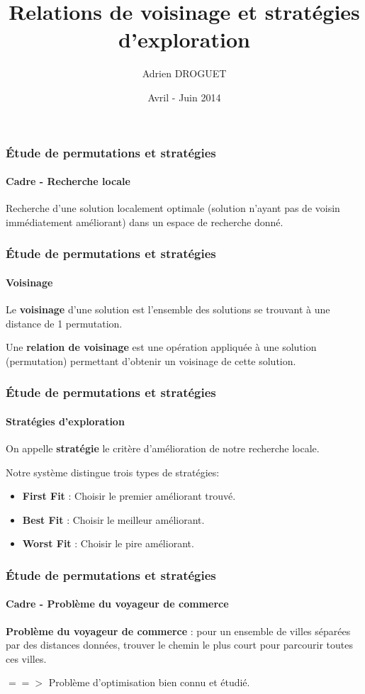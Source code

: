 \documentclass{beamer}
\title{Relations de voisinage et stratégies d'exploration}
\author{Adrien DROGUET}
\date{Avril - Juin 2014}
\begin{document}
\frame{\titlepage}


\begin{frame}
  \frametitle{Étude de permutations et stratégies}
  \framesubtitle{Cadre - Recherche locale}

  \begin{definition}
    Recherche d'une solution localement optimale (solution n'ayant pas de voisin
immédiatement améliorant) dans un espace de recherche donné.
  \end{definition}

  
\end{frame}


\begin{frame}
  \frametitle{Étude de permutations et stratégies}
  \framesubtitle{Voisinage}
  
  \begin{definition}
    Le \textbf{voisinage} d'une solution est l'ensemble des solutions se
trouvant à une distance de 1 permutation.
  \end{definition}

  \begin{definition}
    Une \textbf{relation de voisinage} est une opération appliquée à une
solution (permutation) permettant d'obtenir un voisinage de cette solution.
  \end{definition}
\end{frame}


\begin{frame}
  \frametitle{Étude de permutations et stratégies}
  \framesubtitle{Stratégies d'exploration}
  \begin{definition}
    On appelle \textbf{stratégie} le critère d'amélioration de notre recherche
locale.
  \end{definition}

  
  Notre système distingue trois types de stratégies:
  \begin{itemize}
   \item \textbf{First Fit} : Choisir le premier améliorant trouvé.
   \item \textbf{Best Fit} : Choisir le meilleur améliorant.
   \item \textbf{Worst Fit} : Choisir le pire améliorant.
  \end{itemize}

\end{frame}


\begin{frame}
  \frametitle{Étude de permutations et stratégies}
  \framesubtitle{Cadre - Problème du voyageur de commerce}
  \begin{definition}
    \textbf{Problème du voyageur de commerce} : pour un ensemble de villes
séparées par des distances données, trouver le chemin le plus court pour
parcourir toutes ces villes.
  \end{definition}
  $==>$ Problème d'optimisation bien connu et étudié.
  
\end{frame}
\end{document}
